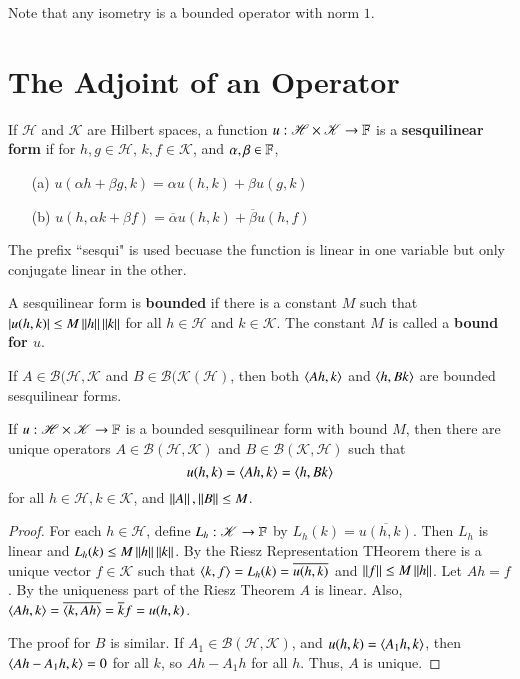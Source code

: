 Note that any isometry is a bounded operator with norm $1$.


\section{The Adjoint of an Operator}
\label{sec:adj}

\begin{defn}
    If $\mathscr{H}$ and $\mathscr{K}$ are Hilbert spaces, a function $u:\mathscr{H}\times \mathscr{K}\rightarrow \mathbb F$ is a \textbf{sesquilinear form} if for $h,g \in \mathscr{H}$, $k,f \in \mathscr{K}$, and $\alpha, \beta \in \mathbb F$, \begin{enumerate}
        \item[(a)] $u(\alpha h+\beta g,k) = \alpha u(h,k) + \beta u(g,k)$ 
        \item[(b)] $u(h,\alpha k+\beta f) = \overline{\alpha}u(h,k)+\overline{\beta}u(h,f)$
    \end{enumerate}
\end{defn}

The prefix ``sesqui" is used becuase the function is linear in one variable but only conjugate linear in the other.

A sesquilinear form is \textbf{bounded} if there is a constant $M$ such that $|u(h,k)| \leq M\left|\left| h\right|\right|\left|\left| k\right|\right|$ for all $h \in \mathscr{H}$ and $k \in \mathscr{K}$. The constant $M$ is called a \textbf{bound for $u$}.

If $A \in \mathscr{B}(\mathscr{H},\mathscr{K}$ and $B \in \mathscr{B}(\mathscr{K}(\mathscr{H})$, then both $\left\langle Ah, k\right\rangle$ and $\left\langle h, Bk\right\rangle$ are bounded sesquilinear forms.

\begin{thm}
    If $u:\mathscr{H}\times \mathscr{K}\rightarrow \mathbb F$ is a bounded sesquilinear form with bound $M$, then there are unique operators $A \in \mathscr{B}(\mathscr{H},\mathscr{K})$ and $B \in \mathscr{B}(\mathscr{K},\mathscr{H})$ such that $$u(h,k) = \left\langle Ah, k\right\rangle = \left\langle h, Bk\right\rangle$$
    for all $h \in \mathscr{H}, k \in \mathscr{K}$, and $\left|\left| A\right|\right|,\left|\left| B\right|\right| \leq M$.
\end{thm}
\begin{proof}
    For each $h \in \mathscr{H}$, define $L_h:\mathscr{K}\rightarrow \mathbb F$ by $L_h(k) = \overline{u(h,k)}$. Then $L_h$ is linear and $L_h(k) \leq M\left|\left| h\right|\right|\left|\left| k\right|\right|$. By the Riesz Representation THeorem there is a unique vector $f \in \mathscr{K}$ such that $\left\langle k, f\right\rangle = L_h(k) = \overline{u(h,k)}$ and $\left|\left| f\right|\right| \leq M\left|\left| h\right|\right|$. Let $Ah = f$. By the uniqueness part of the Riesz Theorem $A$ is linear. Also, $\left\langle Ah, k\right\rangle = \overline{\left\langle k, Ah\right\rangle} = \overline{k}{f} = u(h,k)$.

    The proof for $B$ is similar. If $A_1 \in \mathscr{B}(\mathscr{H},\mathscr{K})$, and $u(h,k) = \left\langle A_1h, k\right\rangle$, then $\left\langle Ah-A_1h, k\right\rangle = 0$ for all $k$, so $Ah-A_1h$ for all $h$. Thus, $A$ is unique.
\end{proof}

